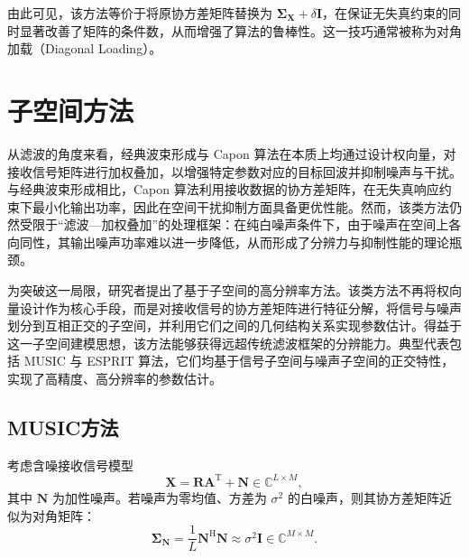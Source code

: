由此可见，该方法等价于将原协方差矩阵替换为 \(\mathbf{\Sigma}_{\mathbf{X}} + \delta \mathbf{I}\)，在保证无失真约束的同时显著改善了矩阵的条件数，从而增强了算法的鲁棒性。这一技巧通常被称为对角加载（Diagonal Loading）。

\section{子空间方法}
从滤波的角度来看，经典波束形成与 Capon 算法在本质上均通过设计权向量，对接收信号矩阵进行加权叠加，以增强特定参数对应的目标回波并抑制噪声与干扰。与经典波束形成相比，Capon 算法利用接收数据的协方差矩阵，在无失真响应约束下最小化输出功率，因此在空间干扰抑制方面具备更优性能。然而，该类方法仍然受限于``滤波—加权叠加''的处理框架：在纯白噪声条件下，由于噪声在空间上各向同性，其输出噪声功率难以进一步降低，从而形成了分辨力与抑制性能的理论瓶颈。

为突破这一局限，研究者提出了基于子空间的高分辨率方法。该类方法不再将权向量设计作为核心手段，而是对接收信号的协方差矩阵进行特征分解，将信号与噪声划分到互相正交的子空间，并利用它们之间的几何结构关系实现参数估计。得益于这一子空间建模思想，该方法能够获得远超传统滤波框架的分辨能力。典型代表包括 MUSIC 与 ESPRIT 算法，它们均基于信号子空间与噪声子空间的正交特性，实现了高精度、高分辨率的参数估计。

\subsection{MUSIC方法}
考虑含噪接收信号模型
\[
    \mathbf{X} = \mathbf{R}\mathbf{A}^{\mathrm{T}} + \mathbf{N} \in \mathbb{C}^{L \times M},
\]
其中 \(\mathbf{N}\) 为加性噪声。若噪声为零均值、方差为 \(\sigma^2\) 的白噪声，则其协方差矩阵近似为对角矩阵：
\[
    \mathbf{\Sigma}_{\mathbf{N}}
    = \frac{1}{L}\mathbf{N}^{\mathrm{H}}\mathbf{N}
    \approx \sigma^2 \mathbf{I} \in \mathbb{C}^{M \times M}.
\]

